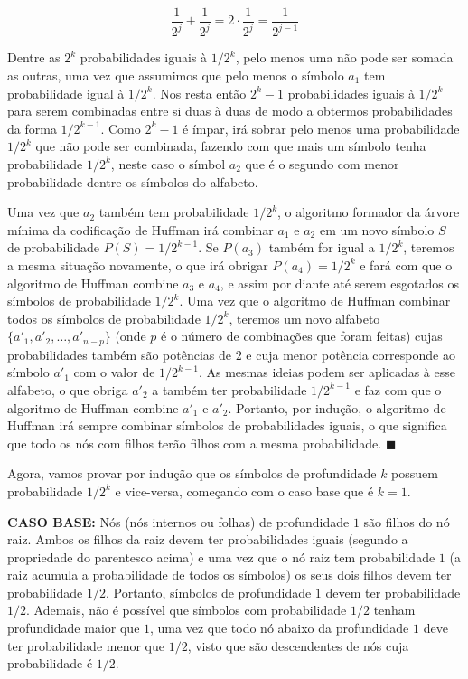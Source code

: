 \documentclass[12pt, a4paper]{article}
\begin{document}
\[ \frac{1}{2^j} + \frac{1}{2^j} = 2 \cdot \frac{1}{2^j} = \frac{1}{2^{j-1}} \] 

Dentre as $2^k$ probabilidades iguais à $1/2^k$, pelo menos uma não pode ser somada as outras, uma vez que assumimos que pelo menos o símbolo $a_1$ tem probabilidade igual à $1/2^k$. Nos resta então $2^k - 1$ probabilidades iguais à $1/2^k$ para serem combinadas entre si duas à duas de modo a obtermos probabilidades da forma $1/2^{k-1}$. Como $2^k - 1$ é ímpar, irá sobrar pelo menos uma probabilidade $1/2^k$ que não pode ser combinada, fazendo com que mais um símbolo tenha probabilidade $1/2^k$, neste caso o símbol $a_2$ que é o segundo com menor probabilidade dentre os símbolos do alfabeto.

Uma vez que $a_2$ também tem probabilidade $1/2^k$, o algoritmo formador da árvore mínima da codificação de Huffman irá combinar $a_1$ e $a_2$ em um novo símbolo $S$ de probabilidade $P(S)=1/2^{k-1}$. Se $P(a_3)$ também for igual a $1/2^k$, teremos a mesma situação novamente, o que irá obrigar $P(a_4)=1/2^k$ e fará com que o algoritmo de Huffman combine $a_3$ e $a_4$, e assim por diante até serem esgotados os símbolos de probabilidade $1/2^k$. Uma vez que o algoritmo de Huffman combinar todos os símbolos de probabilidade $1/2^k$, teremos um novo alfabeto $\{ a'_1, a'_2, \ldots, a'_{n-p} \}$ (onde $p$ é o número de combinações que foram feitas) cujas probabilidades também são potências de $2$ e cuja menor potência corresponde ao símbolo $a'_1$ com o valor de $1/2^{k-1}$. As mesmas ideias podem ser aplicadas à esse alfabeto, o que obriga $a'_2$ a também ter probabilidade $1/2^{k-1}$ e faz com que o algoritmo de Huffman combine $a'_1$ e $a'_2$. Portanto, por indução, o algoritmo de Huffman irá sempre combinar símbolos de probabilidades iguais, o que significa que todo os nós com filhos terão filhos com a mesma probabilidade. $\blacksquare$

Agora, vamos provar por indução que os símbolos de profundidade $k$ possuem probabilidade $1/2^k$ e vice-versa, começando com o caso base que é $k=1$.

\textbf{CASO BASE:} Nós (nós internos ou folhas) de profundidade $1$ são filhos do nó raiz. Ambos os filhos da raiz devem ter probabilidades iguais (segundo a propriedade do parentesco acima) e uma vez que o nó raiz tem probabilidade $1$ (a raiz acumula a probabilidade de todos os símbolos) os seus dois filhos devem ter probabilidade $1/2$. Portanto, símbolos de profundidade $1$ devem ter probabilidade $1/2$. Ademais, não é possível que símbolos com probabilidade $1/2$ tenham profundidade maior que $1$, uma vez que todo nó abaixo da profundidade $1$ deve ter probabilidade menor que $1/2$, visto que são descendentes de nós cuja probabilidade é $1/2$.
\end{document}
